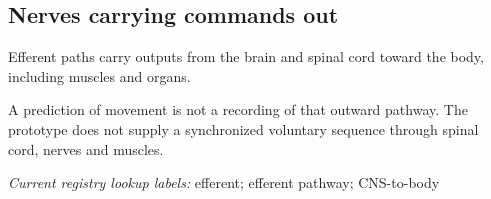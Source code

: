 \begin{samepage}
\subsection*{Nerves carrying commands out}
\noindent Efferent paths carry outputs from the brain and spinal cord toward the body, including muscles and organs.\par
\end{samepage}
\begin{samepage}
\noindent A prediction of movement is not a recording of that outward pathway. The prototype does not supply a synchronized voluntary sequence through spinal cord, nerves and muscles.\par\nopagebreak[4]

\end{samepage}


\noindent\textit{Current registry lookup labels:} efferent; efferent pathway; CNS-to-body\par

